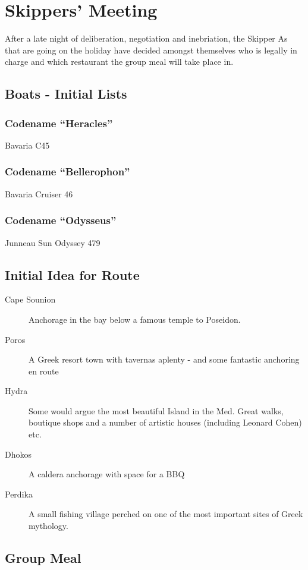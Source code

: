 
\section*{Skippers' Meeting}

After a late night of deliberation, negotiation and inebriation, the Skipper As that are going on the holiday have decided amongst themselves who is legally in charge and which restaurant the group meal will take place in.

\subsection*{Boats - Initial Lists}

\subsubsection*{Codename ``Heracles''}
\textsf{Bavaria C45}

\subsubsection*{Codename ``Bellerophon''}
\textsf{Bavaria Cruiser 46}

\subsubsection*{Codename ``Odysseus''}
\textsf{Junneau Sun Odyssey 479}

\subsection*{Initial Idea for Route}
\begin{description}
\item[Cape Sounion] Anchorage in the bay below a famous temple to Poseidon.
\item[Poros] A Greek resort town with tavernas aplenty - and some fantastic anchoring en route
\item[Hydra] Some would argue the most beautiful Island in the Med. Great walks, boutique shops and a number of artistic houses (including Leonard Cohen) etc.  
\item[Dhokos] A caldera anchorage with space for a BBQ
\item[Perdika] A small fishing village perched on one of the most important sites of Greek mythology.  
\end{description}

\subsection*{Group Meal}

